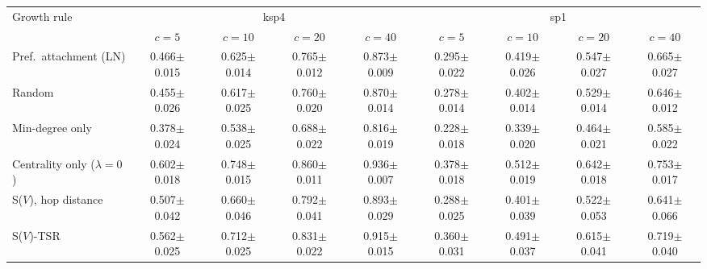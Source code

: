 \begin{tabular}{lcccccccc}
\toprule
Growth rule & \multicolumn{4}{c}{ksp4} & \multicolumn{4}{c}{sp1} \\
& $c{=}5$ & $c{=}10$ & $c{=}20$ & $c{=}40$ & $c{=}5$ & $c{=}10$ & $c{=}20$ & $c{=}40$ \\
\midrule
Pref.\ attachment (LN) & 0.466$\pm$0.015 & 0.625$\pm$0.014 & 0.765$\pm$0.012 & 0.873$\pm$0.009 & 0.295$\pm$0.022 & 0.419$\pm$0.026 & 0.547$\pm$0.027 & 0.665$\pm$0.027 \\
Random & 0.455$\pm$0.026 & 0.617$\pm$0.025 & 0.760$\pm$0.020 & 0.870$\pm$0.014 & 0.278$\pm$0.014 & 0.402$\pm$0.014 & 0.529$\pm$0.014 & 0.646$\pm$0.012 \\
Min-degree only & 0.378$\pm$0.024 & 0.538$\pm$0.025 & 0.688$\pm$0.022 & 0.816$\pm$0.019 & 0.228$\pm$0.018 & 0.339$\pm$0.020 & 0.464$\pm$0.021 & 0.585$\pm$0.022 \\
Centrality only ($\lambda{=}0$) & 0.602$\pm$0.018 & 0.748$\pm$0.015 & 0.860$\pm$0.011 & 0.936$\pm$0.007 & 0.378$\pm$0.018 & 0.512$\pm$0.019 & 0.642$\pm$0.018 & 0.753$\pm$0.017 \\
S($V$), hop distance & 0.507$\pm$0.042 & 0.660$\pm$0.046 & 0.792$\pm$0.041 & 0.893$\pm$0.029 & 0.288$\pm$0.025 & 0.401$\pm$0.039 & 0.522$\pm$0.053 & 0.641$\pm$0.066 \\
S($V$)-TSR & 0.562$\pm$0.025 & 0.712$\pm$0.025 & 0.831$\pm$0.022 & 0.915$\pm$0.015 & 0.360$\pm$0.031 & 0.491$\pm$0.037 & 0.615$\pm$0.041 & 0.719$\pm$0.040 \\
\bottomrule
\end{tabular}
